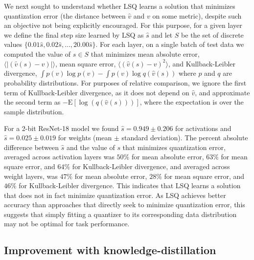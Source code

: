 \documentclass{article}
\begin{document}
We next sought to understand whether LSQ learns a solution that minimizes quantization error (the distance between $\hat{v}$ and $v$ on some metric), despite such an objective not being explicitly encouraged.
For this purpose, for a given layer we define the final step size learned by LSQ as $\hat{s}$ and let $S$ be the set of discrete values $\{0.01\hat{s}, 0.02\hat{s}, ..., 20.00\hat{s}\}$.
For each layer, on a single batch of test data we computed the value of $s \in S$ that minimizes
mean absolute error, $\langle |(\hat{v}(s) - v)| \rangle$,
mean square error, $\langle (\hat{v}(s) - v)^2 \rangle$,
and Kullback-Leibler divergence, $\int p(v) \log p(v) - \int p(v) \log q(\hat{v}(s))$ where $p$ and $q$ are probability distributions.
For purposes of relative comparison, we ignore the first term of Kullback-Leibler divergence, as it does not depend on $\hat{v}$, and approximate the second term as $ - \text{E}[ \log(q(\hat{v}(s)))]$, where the expectation is over the sample distribution.


For a 2-bit ResNet-18 model we found $\hat{s}=0.949 \pm 0.206$ for activations and $\hat{s}=0.025 \pm 0.019$ for weights (mean $\pm$ standard deviation).
The percent absolute difference between $\hat{s}$ and the value of $s$ that minimizes quantization error, averaged across activation layers was $50\%$ for mean absolute error, $63\%$ for mean square error, and $64\%$ for Kullback-Leibler divergence,
and averaged across weight layers, was $47\%$ for  mean absolute error, $28\%$ for mean square error, and $46\%$ for Kullback-Leibler divergence.
This indicates that LSQ learns a solution that does not in fact minimize quantization error.
As LSQ achieves better accuracy than approaches that directly seek to minimize quantization error, this suggests that simply fitting a quantizer to its corresponding data distribution may not be optimal for task performance.



\subsection{Improvement with knowledge-distillation}
\end{document}
